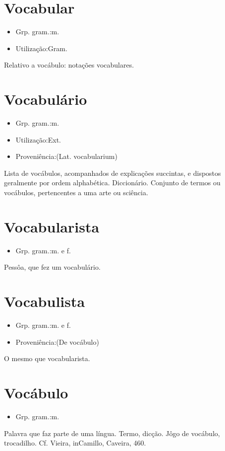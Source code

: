 \documentclass{article}
\begin{document}
\section{Vocabular}
\begin{itemize}
\item {Grp. gram.:m.}
\end{itemize}
\begin{itemize}
\item {Utilização:Gram.}
\end{itemize}
Relativo a vocábulo: \textunderscore notações vocabulares\textunderscore .
\section{Vocabulário}
\begin{itemize}
\item {Grp. gram.:m.}
\end{itemize}
\begin{itemize}
\item {Utilização:Ext.}
\end{itemize}
\begin{itemize}
\item {Proveniência:(Lat. \textunderscore vocabularium\textunderscore )}
\end{itemize}
Lista de vocábulos, acompanhados de explicações succintas, e dispostos geralmente por ordem alphabética.
Diccionário.
Conjunto de termos ou vocábulos, pertencentes a uma arte ou sciência.
\section{Vocabularista}
\begin{itemize}
\item {Grp. gram.:m.  e  f.}
\end{itemize}
Pessôa, que fez um vocabulário.
\section{Vocabulista}
\begin{itemize}
\item {Grp. gram.:m.  e  f.}
\end{itemize}
\begin{itemize}
\item {Proveniência:(De \textunderscore vocábulo\textunderscore )}
\end{itemize}
O mesmo que \textunderscore vocabularista\textunderscore .
\section{Vocábulo}
\begin{itemize}
\item {Grp. gram.:m.}
\end{itemize}
Palavra que faz parte de uma língua.
Termo, dicção.
\textunderscore Jôgo de vocábulo\textunderscore , trocadilho. Cf. Vieira, \textunderscore in\textunderscore  Camillo, \textunderscore Caveira\textunderscore , 460.
\end{document}
